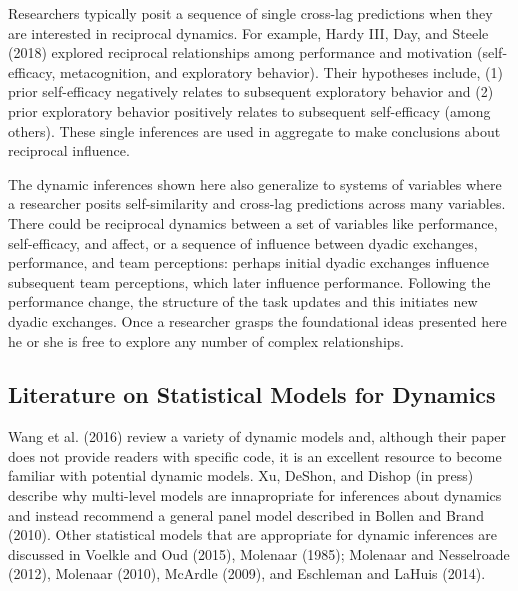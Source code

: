 \documentclass[english,,man]{apa6}
\begin{document}
Researchers typically posit a sequence of single cross-lag predictions when they are interested in reciprocal dynamics. For example, Hardy III, Day, and Steele (2018) explored reciprocal relationships among performance and motivation (self-efficacy, metacognition, and exploratory behavior). Their hypotheses include, (1) prior self-efficacy negatively relates to subsequent exploratory behavior and (2) prior exploratory behavior positively relates to subsequent self-efficacy (among others). These single inferences are used in aggregate to make conclusions about reciprocal influence.

The dynamic inferences shown here also generalize to systems of variables where a researcher posits self-similarity and cross-lag predictions across many variables. There could be reciprocal dynamics between a set of variables like performance, self-efficacy, and affect, or a sequence of influence between dyadic exchanges, performance, and team perceptions: perhaps initial dyadic exchanges influence subsequent team perceptions, which later influence performance. Following the performance change, the structure of the task updates and this initiates new dyadic exchanges. Once a researcher grasps the foundational ideas presented here he or she is free to explore any number of complex relationships.

\hypertarget{literature-on-statistical-models-for-dynamics}{%
\subsection{Literature on Statistical Models for Dynamics}\label{literature-on-statistical-models-for-dynamics}}

Wang et al. (2016) review a variety of dynamic models and, although their paper does not provide readers with specific code, it is an excellent resource to become familiar with potential dynamic models. Xu, DeShon, and Dishop (in press) describe why multi-level models are innapropriate for inferences about dynamics and instead recommend a general panel model described in Bollen and Brand (2010). Other statistical models that are appropriate for dynamic inferences are discussed in Voelkle and Oud (2015), Molenaar (1985); Molenaar and Nesselroade (2012), Molenaar (2010), McArdle (2009), and Eschleman and LaHuis (2014).
\end{document}
